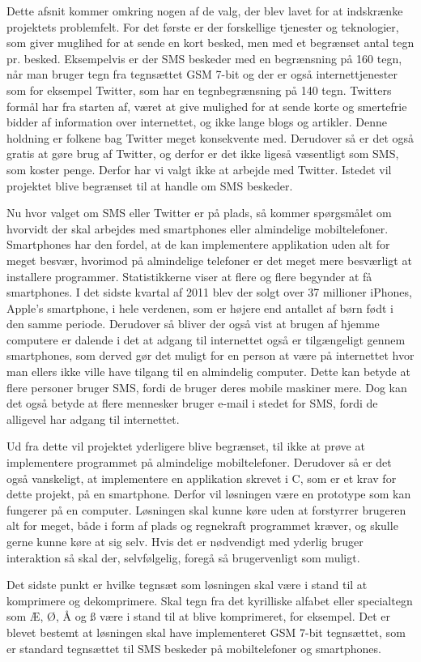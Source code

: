 Dette afsnit kommer omkring nogen af de valg, der blev lavet for at indskrænke projektets problemfelt. For det første er der forskellige tjenester og teknologier, som giver muglihed for at sende en kort besked, men med et begrænset antal tegn pr. besked. Eksempelvis er der SMS beskeder med en begrænsning på 160 tegn, når man bruger tegn fra tegnsættet GSM 7-bit\cite{Pro_1} og der er også internettjenester som for eksempel Twitter, som har en tegnbegrænsning på 140 tegn\cite{pro_af1}. Twitters formål har fra starten af, været at give mulighed for at sende korte og smertefrie bidder af information over internettet, og ikke lange blogs og artikler. Denne holdning er folkene bag Twitter meget konsekvente med\cite{pro_af2}. Derudover så er det også gratis at gøre brug af Twitter, og derfor er det ikke ligeså væsentligt som SMS, som koster penge. Derfor har vi valgt ikke at arbejde med Twitter. Istedet vil projektet blive begrænset til at handle om SMS beskeder.

Nu hvor valget om SMS eller Twitter er på plads, så kommer spørgsmålet om hvorvidt der skal arbejdes med smartphones eller almindelige mobiltelefoner. Smartphones har den fordel, at de kan implementere applikation uden alt for meget besvær, hvorimod på almindelige telefoner er det meget mere besværligt at installere programmer. Statistikkerne viser at flere og flere begynder at få smartphones\cite{pro_af3}. I det sidste kvartal af 2011 blev der solgt over 37 millioner iPhones, Apple's smartphone, i hele verdenen, som er højere end antallet af børn født i den samme periode\cite{pro_af4}. Derudover så bliver der også vist at brugen af hjemme computere er dalende i det at adgang til internettet også er tilgængeligt gennem smartphones, som derved gør det muligt for en person at være på internettet hvor man ellers ikke ville have tilgang til en almindelig computer\cite{pro_af3}. Dette kan betyde at flere personer bruger SMS, fordi de bruger deres mobile maskiner mere. Dog kan det også betyde at flere mennesker bruger e-mail i stedet for SMS, fordi de alligevel har adgang til internettet. 

Ud fra dette vil projektet yderligere blive begrænset, til ikke at prøve at implementere programmet på almindelige mobiltelefoner. Derudover så er det også vanskeligt, at implementere en applikation skrevet i C, som er et krav for dette projekt, på en smartphone. Derfor vil løsningen være en prototype som kan fungerer på en computer. Løsningen skal kunne køre uden at forstyrrer brugeren alt for meget, både i form af plads og regnekraft programmet kræver, og skulle gerne kunne køre at sig selv. Hvis det er nødvendigt med yderlig bruger interaktion så skal der, selvfølgelig, foregå så brugervenligt som muligt.

Det sidste punkt er hvilke tegnsæt som løsningen skal være i stand til at komprimere og dekomprimere. Skal tegn fra det kyrilliske alfabet eller specialtegn som Æ, Ø, Å og ß være i stand til at blive komprimeret, for eksempel. Det er blevet bestemt at løsningen skal have implementeret GSM 7-bit tegnsættet, som er standard tegnsættet til SMS beskeder på mobiltelefoner og smartphones.
